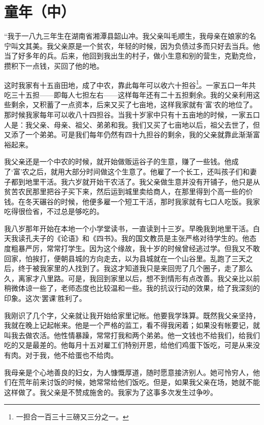 \documentclass[10pt]{book}
\begin{document}
\section{童年（中）}

“我于一八九三年生在湖南省湘潭县韶山冲。我父亲叫毛顺生，我母亲在娘家的名宁叫文其美。我父亲原是一个贫农，年轻的时候，因为负债过多而只好去当兵。他当了好多年的兵。后来，他回到我出生的村子，做小生意和别的营生，克勤克俭，攒积下一点钱，买回了他的地。

这时我家有十五亩田地，成了中农，靠此每年可以收六十担谷\footnote{一担合一百三十三磅又三分之一。}。一家五口一年共吃三十五担——即每人七担左右——这样每年还有二十五担剩余。我的父亲利用这些剩余，又积蓄了一点资本，后来又买了七亩地，这样我家就有‘富’农的地位了。那时候我家每年可以收八十四担谷。当我十岁家中只有十五亩地的时候，一家五口人是：我父亲、母亲、祖父、弟弟和我。我们又买了七亩地以后，祖父去世了，但又添了一个弟弟。可是我们每年仍然有四十九担谷的剩余，我的父亲就靠此渐渐富裕起来。

我父亲还是一个中农的时候，就开始做贩运谷子的生意，赚了一些钱。他成了‘富’农之后，就用大部分时间做这个生意了。他雇了一个长工，还叫孩子们和妻子都到地里干活。我六岁就开始干农活了。我父亲做生意并没有开铺子，他只是从贫苦农民那里把谷子买下来，然后运到城里卖给商人，在那里得到个高一些的价钱。在冬天碾谷的时候，他便多雇一个短工干活，那时我家就有七口人吃饭。我家吃得很俭省，不过总是够吃的。

我八岁那年开始在本地一个小学堂读书，一直读到十三岁。早晚我到地里干活。白天我读孔夫子的《论语》和《四书》。我的国文教员是主张严格对待学生的。他态度粗暴严厉，常常打学生。因为这个缘故，我十岁的时候曾经逃过学。但我又不敢回家，怕挨打，便朝县城的方向走去，以为县城就在一个山谷里。乱跑了三天之后，终于被我家里的人找到了。我这才知道我只是来回兜了几个圈子，走了那么久，离家才八里路。可是，我回到家里以后，想不到情形有点改善。我父亲比以前稍微体谅一些了，老师态度也比较温和一些。我的抗议行动的效果，给了我深刻的印象。这次‘罢课’胜利了。

我刚识了几个字，父亲就让我开始给家里记帐。他要我学珠算。既然我父亲坚持，我就在晚上记起帐来。他是一个严格的监工，看不得我闲着；如果没有帐要记，就叫我去做农活。他性情暴躁，常常打我和两个弟弟。他一文钱也不给我们，给我们吃的又是最差的。他每月十五对雇工们特别开恩，给他们鸡蛋下饭吃，可是从来没有肉。对于我，他不给蛋也不给肉。

我母亲是个心地善良的妇女，为人慷慨厚道，随时愿意接济别人。她可怜穷人，他们在荒年前来讨饭的时候，她常常给他们饭吃。但是，如果我父亲在场，她就不能这样做了。我父亲是不赞成施舍的。我家为了这事多次发生过争吵。
\end{document}

